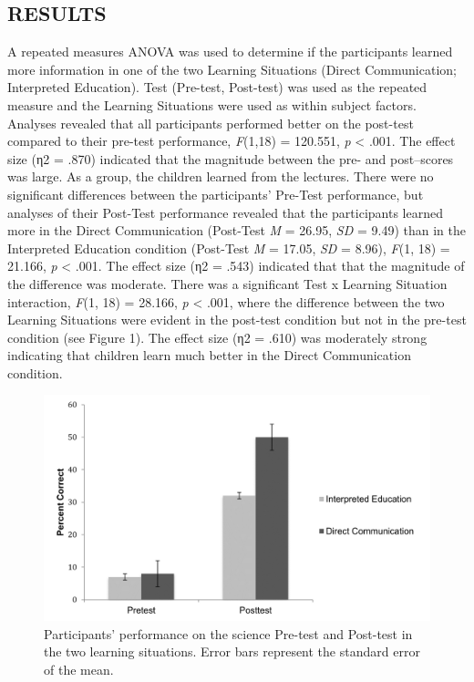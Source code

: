 \documentclass[11.5pt]{sig-alternate} %
\begin{document}
\begin{large}
\section*{RESULTS}

A repeated measures ANOVA was used to determine if the participants learned more information in one of the two Learning Situations (Direct Communication; Interpreted Education). Test (Pre-test, Post-test) was used as the repeated measure and the Learning Situations were used as within subject factors. Analyses revealed that all participants performed better on the post-test compared to their pre-test performance, \textit{F}(1,18) = 120.551, \textit{p} < .001. The effect size (η2 = .870) indicated that the magnitude between the pre- and post–scores was large. As a group, the children learned from the lectures. There were no significant differences between the participants’ Pre-Test performance, but analyses of their Post-Test performance revealed that the participants learned more in the Direct Communication (Post-Test \textit{M} = 26.95, \textit{SD} = 9.49) than in the Interpreted Education condition (Post-Test \textit{M} = 17.05, \textit{SD} = 8.96), \textit{F}(1, 18) = 21.166, \textit{p} < .001. The effect size (η2 = .543) indicated that that the magnitude of the difference was moderate. There was a significant Test x Learning Situation interaction, \textit{F}(1, 18) = 28.166, \textit{p} < .001, where the difference between the two Learning Situations were evident in the post-test condition but not in the pre-test condition (see Figure 1). The effect size (η2 = .610) was moderately strong indicating that children learn much better in the Direct Communication condition. 

\begin{figure}[h]
    \centering
    \includegraphics[width=1\linewidth]{images/fig1.png}
    \caption{Participants’ performance on the science Pre-test and Post-test in the two learning situations. Error bars represent the standard error of the mean.}
\end{figure}


\end{large}
\end{document}
